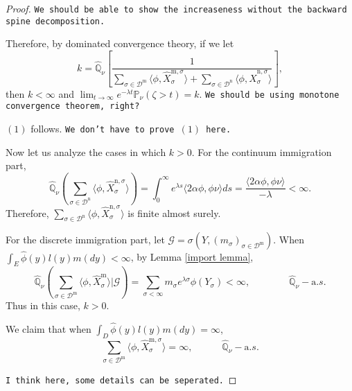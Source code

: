 \documentclass[12pt,a4paper]{amsart}
\numberwithin{equation}{section}
\theoremstyle{plain}
\theoremstyle{definition}
\theoremstyle{remark}
\begin{document}
\begin{proof}
    {\tt We should be able to show the increaseness without the backward spine decomposition.}
    
    Therefore, by dominated convergence theory, if we let
\begin{equation}\label{cons}
	k=\widehat{\mathbb Q}_{\nu}\left[\frac{1}{\sum_{\sigma\in\mathcal D^{\mathrm m}}\langle \phi, \widehat X_{\sigma}^{{\mathrm m},\sigma}\rangle +\sum_{\sigma\in \mathcal D^{\mathrm n}}\langle \phi, \widehat X_{\sigma}^{{\mathrm n},\sigma}\rangle }\right],
\end{equation}
then $k<\infty$ and $\lim_{t\to\infty} e^{-\lambda t}\mathbb P_{\nu}(\zeta>t)=k$.  {\tt We should be using monotone convergence theorem, right?}

$(1)$ follows. {\tt We don't have to prove $(1)$ here.}

 Now let us analyze the cases in which $k>0$.	For the continuum immigration part,
\[
	\widehat{\mathbb Q}_{\nu}\left(\sum_{\sigma\in \mathcal D^{\mathrm n}}\langle \phi, \widehat X_{\sigma}^{{\mathrm n},\sigma}\rangle \right)=\int_0^\infty e^{\lambda s}\langle 2\alpha\phi, \phi\nu\rangle  ds=\frac{\langle 2\alpha\phi, \phi\nu\rangle}{-\lambda}<\infty.
\]
	Therefore, $\sum_{\sigma\in \mathcal D^{\mathrm n}}\langle \phi, \widehat X_{\sigma}^{{\mathrm n},\sigma}\rangle$ is finite almost surely.

	For the discrete immigration part, let $\mathcal G=\sigma(Y, ( m_\sigma)_{\sigma\in\mathcal D^{\mathrm m}})$.  When  $\int_E\hat{\phi}(y)l(y)m(dy)<\infty$, by Lemma \ref{import lemma},
\[
	\widehat{\mathbb Q}_{\nu}\left(\sum_{\sigma\in \mathcal D^{\mathrm m}}\langle \phi, \widehat X_{\sigma}^{{\mathrm m}}\rangle\Big|\mathcal G \right)
	=\sum_{\sigma<\infty}m_\sigma e^{\lambda \sigma}\phi(Y_{\sigma})<\infty,  \qquad\qquad \widehat{\mathbb Q}_{\nu}-{\mathrm a.s.}
\]
	Thus in this case, $k>0$.

	We claim that when $\int_D\hat\phi(y)l(y)m(dy)=\infty$,
\begin{equation}\label{infty}
	\sum_{\sigma\in \mathcal D^{\mathrm m}}\langle \phi, \widehat X_{\sigma}^{{\mathrm m},\sigma}\rangle =\infty,\quad\qquad  \widehat{\mathbb Q}_\nu-{\mathrm a.s.}
\end{equation}
	
	{\tt I think here, some details can be seperated.}
	

\end{proof}
\end{document}
